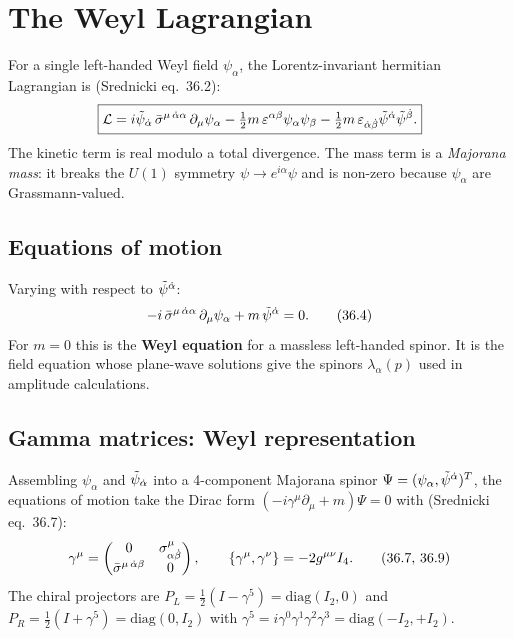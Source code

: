 \section{The Weyl Lagrangian}
\label{sec:weyl-lagrangian}

For a single left-handed Weyl field $\psi_\alpha$, the Lorentz-invariant
hermitian Lagrangian is (Srednicki eq.~36.2):
\begin{equation}
  \boxed{
    \mathcal{L}
    = i\tilde\psi_{\dot{\alpha}}\,\bar{\sigma}^{\mu\,\dot{\alpha}\alpha}\,\partial_\mu\psi_\alpha
    - \tfrac{1}{2}m\,\varepsilon^{\alpha\beta}\psi_\alpha\psi_\beta
    - \tfrac{1}{2}m\,\varepsilon_{\dot{\alpha}\dot{\beta}}\tilde\psi^{\dot{\alpha}}\tilde\psi^{\dot{\beta}}.
  }
\end{equation}
The kinetic term is real modulo a total divergence.  The mass term is a
\emph{Majorana mass}: it breaks the $U(1)$ symmetry $\psi\to e^{i\alpha}\psi$
and is non-zero because $\psi_\alpha$ are Grassmann-valued.

\subsection{Equations of motion}

Varying with respect to $\tilde\psi^{\dot{\alpha}}$:
\begin{equation}
  -i\,\bar{\sigma}^{\mu\,\dot{\alpha}\alpha}\,\partial_\mu\psi_\alpha + m\,\tilde\psi^{\dot{\alpha}} = 0.
  \tag{36.4}
\end{equation}
For $m=0$ this is the \textbf{Weyl equation} for a massless left-handed
spinor.  It is the field equation whose plane-wave solutions give
the spinors $\lambda_\alpha(p)$ used in amplitude calculations.

\subsection{Gamma matrices: Weyl representation}

Assembling $\psi_\alpha$ and $\tilde\psi_{\dot{\alpha}}$ into a 4-component
Majorana spinor $\Psi = (\psi_\alpha, \tilde\psi^{\dot{\alpha}})^T$, the equations
of motion take the Dirac form $(-i\gamma^\mu\partial_\mu + m)\Psi = 0$ with
(Srednicki eq.~36.7):
\begin{equation}
  \gamma^\mu =
  \begin{pmatrix} 0 & \sigma^\mu_{\alpha\dot{\beta}} \\
                  \bar{\sigma}^{\mu\,\dot{\alpha}\beta} & 0 \end{pmatrix},
  \qquad
  \{\gamma^\mu,\gamma^\nu\} = -2g^{\mu\nu}I_4.
  \tag{36.7, 36.9}
\end{equation}
The chiral projectors are
$P_L = \tfrac{1}{2}(I-\gamma^5) = \mathrm{diag}(I_2,0)$ and
$P_R = \tfrac{1}{2}(I+\gamma^5) = \mathrm{diag}(0,I_2)$
with $\gamma^5 = i\gamma^0\gamma^1\gamma^2\gamma^3 = \mathrm{diag}(-I_2,+I_2)$.

